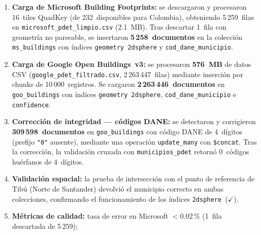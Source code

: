 \documentclass[12pt, a4paper]{report}
\begin{document}
\begin{enumerate}[label=\textbf{\arabic*.}]
  \item \textbf{Carga de Microsoft Building Footprints:}
        se descargaron y procesaron 16~tiles QuadKey (de 232~disponibles para
        Colombia), obteniendo 5\,259~filas en \texttt{microsoft\_pdet\_limpio.csv}
        (2.1~MB). Tras descartar 1~fila con geometría no parseable, se
        insertaron \textbf{5\,258~documentos} en la colección
        \texttt{ms\_buildings} con índices
        \texttt{geometry~2dsphere} y \texttt{cod\_dane\_municipio}.

  \item \textbf{Carga de Google Open Buildings~v3:}
        se procesaron \textbf{576~MB} de datos CSV
        (\texttt{google\_pdet\_filtrado.csv}, 2\,263\,447~filas) mediante
        inserción por chunks de 10\,000~registros.
        Se cargaron \textbf{2\,263\,446~documentos} en \texttt{goo\_buildings}
        con índices \texttt{geometry~2dsphere}, \texttt{cod\_dane\_municipio}
        e \texttt{confidence}.

  \item \textbf{Corrección de integridad — códigos DANE:}
        se detectaron y corrigieron \textbf{309\,598~documentos} en
        \texttt{goo\_buildings} con código DANE de 4~dígitos
        (prefijo \texttt{"0"} ausente), mediante una operación
        \texttt{update\_many} con \texttt{\$concat}.
        Tras la corrección, la validación cruzada con \texttt{municipios\_pdet}
        retornó 0~códigos huérfanos de 4~dígitos.

  \item \textbf{Validación espacial:}
        la prueba de intersección con el punto de referencia de Tibú
        (Norte de Santander) devolvió el municipio correcto en ambas
        colecciones, confirmando el funcionamiento de los índices
        \texttt{2dsphere}~($\checkmark$).

  \item \textbf{Métricas de calidad:}
        tasa de error en Microsoft $< 0.02\,\%$
        (1~fila descartada de 5\,259);
\end{enumerate}
\end{document}
